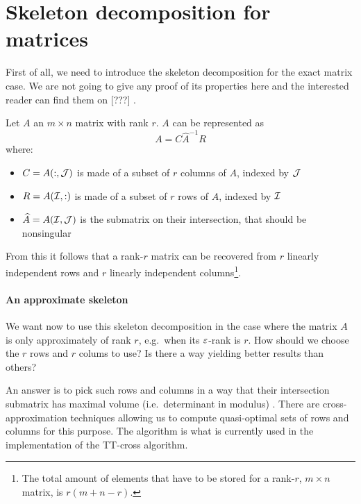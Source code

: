 \section{Skeleton decomposition for matrices}
First of all, we need to introduce the skeleton decomposition for the exact matrix case. We are not going to give any proof of its properties here and the interested reader can find them on [???] .

\begin{Teo}
  Let $A$ an $m \times n$ matrix with rank $r$. $A$ can be represented as
  \begin{equation} \label{def:skeleton}
    A = C \hat{A}^{-1} R
  \end{equation}
  where:
  \begin{itemize}
  \item $C = A(:,\mathcal{J})$ is made of a subset of $r$ columns of $A$, indexed by $\mathcal{J}$
  \item $R = A(\mathcal{I},:)$ is made of a subset of $r$ rows of $A$, indexed by $\mathcal{I}$
  \item $\widehat{A} = A(\mathcal{I},\mathcal{J})$ is the submatrix on their intersection, that should be nonsingular
  \end{itemize}
\end{Teo}

From this it follows that a rank-$r$ matrix can be recovered from $r$ linearly independent rows and $r$ linearly independent columns\footnote{The total amount of elements that have to be stored for a rank-$r$, $m \times n$ matrix, is $r(m+n-r)$.}.

\paragraph{An approximate skeleton}
We want now to use this skeleton decomposition in the case where the matrix $A$ is only approximately of rank $r$, e.g.\ when its $\varepsilon$-rank is $r$.
How should we choose the $r$ rows and $r$ colums to use? Is there a way yielding better results than others?

An answer is to pick such rows and columns in a way that their intersection submatrix has maximal volume (i.e.\ determinant in modulus) . There are cross-approximation techniques allowing us to compute quasi-optimal sets of rows and columns for this purpose. The   algorithm is what is currently used in the implementation of the TT-cross algorithm.

